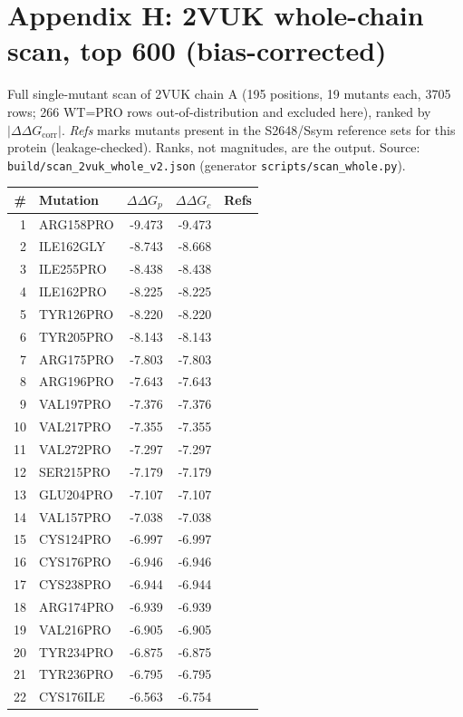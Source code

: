 \section*{Appendix H: 2VUK whole-chain scan, top 600 (bias-corrected)}
Full single-mutant scan of 2VUK chain A (195 positions, 19 mutants each,
3705 rows; 266 WT=PRO rows out-of-distribution and excluded here), ranked by
$|\Delta\Delta G_{\mathrm{corr}}|$. \emph{Refs} marks mutants present in the
S2648/Ssym reference sets for this protein (leakage-checked). Ranks, not
magnitudes, are the output. Source: \texttt{build/scan\_2vuk\_whole\_v2.json}
(generator \texttt{scripts/scan\_whole.py}).
\small\begin{longtable}{r l r r c}
\hline
\# & Mutation & $\Delta\Delta G_{p}$ & $\Delta\Delta G_{c}$ & Refs \\ \hline
\endhead
1 & ARG158PRO & -9.473 & -9.473 &  \\
2 & ILE162GLY & -8.743 & -8.668 &  \\
3 & ILE255PRO & -8.438 & -8.438 &  \\
4 & ILE162PRO & -8.225 & -8.225 &  \\
5 & TYR126PRO & -8.220 & -8.220 &  \\
6 & TYR205PRO & -8.143 & -8.143 &  \\
7 & ARG175PRO & -7.803 & -7.803 &  \\
8 & ARG196PRO & -7.643 & -7.643 &  \\
9 & VAL197PRO & -7.376 & -7.376 &  \\
10 & VAL217PRO & -7.355 & -7.355 &  \\
11 & VAL272PRO & -7.297 & -7.297 &  \\
12 & SER215PRO & -7.179 & -7.179 &  \\
13 & GLU204PRO & -7.107 & -7.107 &  \\
14 & VAL157PRO & -7.038 & -7.038 &  \\
15 & CYS124PRO & -6.997 & -6.997 &  \\
16 & CYS176PRO & -6.946 & -6.946 &  \\
17 & CYS238PRO & -6.944 & -6.944 &  \\
18 & ARG174PRO & -6.939 & -6.939 &  \\
19 & VAL216PRO & -6.905 & -6.905 &  \\
20 & TYR234PRO & -6.875 & -6.875 &  \\
21 & TYR236PRO & -6.795 & -6.795 &  \\
22 & CYS176ILE & -6.563 & -6.754 &  \\

\end{longtable}
